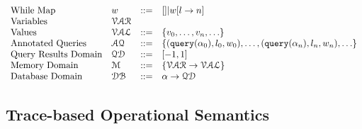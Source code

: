 \documentclass[a4paper,11pt]{article}
\begin{document}
\[\begin{array}{llll}
%
\mbox{While Map}
& w & ::= & {[] |  w[l \to n]}
\\
%
\mbox{Variables} 
& \mathcal{VAR}  &  & 
\\ 
%
\mbox{Values} 
& \mathcal{VAL}  & ::= & \{ v_0, \ldots, v_n, \ldots \}
\\ 
%
\mbox{Annotated Queries} & \mathcal{AQ}  & 
::= & {\{( \query(\qval_0), l_0, w_0), \ldots, (\query(\qval_n), l_n, w_n), \ldots \} } 
\\
%
\mbox{{Query Results Domain}}
& \qdom & ::= & {[-1,1]}
\\
%
\mbox{{Memory Domain}}
& \memdom & ::= & \left\{ \mathcal{VAR} \to \mathcal{VAL} \right\}
\\
%
\mbox{{Database Domain}}
& \dbdom & ::= & \qval \to \qdom
\end{array}
\]
%
%
\subsection{ Trace-based Operational Semantics}
\end{document}
